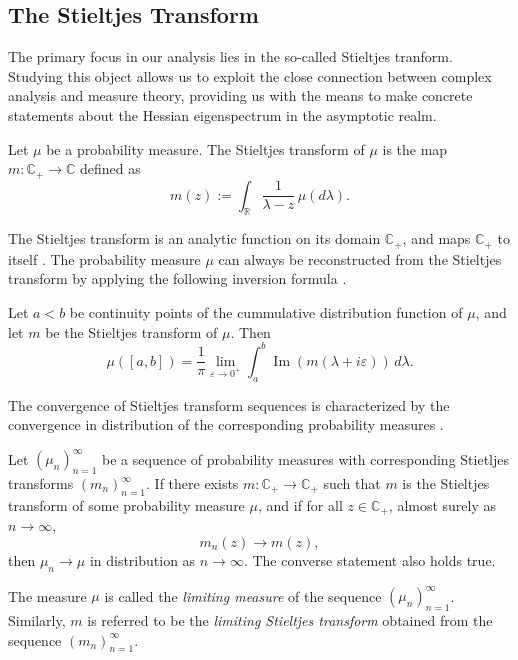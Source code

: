 \documentclass{article}
\begin{document}
\subsection{The Stieltjes Transform}
The primary focus in our analysis lies in the so-called Stieltjes tranform. Studying this object allows us to exploit the close connection between complex analysis and measure theory, providing us with the means to make concrete statements about the Hessian eigenspectrum in the asymptotic realm.
\bigskip
\begin{definition}
Let $\mu$ be a probability measure. The Stieltjes transform of $\mu$ is the map $m:\mathbb{C}_+\to\mathbb{C}$ defined as
$$m(z):=\int_{\mathbb{R}}\frac{1}{\lambda-z}\,\mu(d\lambda).$$
\end{definition}
\smallskip
\par
The Stieltjes transform is an analytic function on its domain $\mathbb{C}_+$, and maps $\mathbb{C}_+$ to itself \cite{hachem}. The probability measure $\mu$ can always be reconstructed from the Stieltjes transform by applying the following inversion formula \cite{couillet, hachem}.
\bigskip
\\
\begin{theorem}
Let $a<b$ be continuity points of the cummulative distribution function of $\mu$, and let $m$ be the Stieltjes transform of $\mu$. Then
$$\mu([a,b])=\frac{1}{\pi}\lim_{\varepsilon\to0^+}\int_a^b\operatorname{Im}(m(\lambda+i\varepsilon))\,d\lambda.$$\label{thm:inversion-formula}
\end{theorem}
\bigskip
\par
The convergence of Stieltjes transform sequences is characterized by the convergence in distribution of the corresponding probability measures \cite{couillet}.
\bigskip
\begin{theorem}\label{thm:limiting-measure}
Let $(\mu_n)_{n=1}^\infty$ be a sequence of probability measures with corresponding Stietljes transforms $(m_n)_{n=1}^\infty$. If there exists $m:\mathbb{C}_+\to\mathbb{C}_+$ such that $m$ is the Stieltjes transform of some probability measure $\mu$, and if for all $z\in\mathbb{C}_+$, almost surely as $n\to\infty$, 
$$m_n(z)\to m(z),$$
then $\mu_n\to\mu$ in distribution as $n\to\infty$. The converse statement also holds true.
\end{theorem}
\bigskip
\par
The measure $\mu$ is called the \emph{limiting measure} of the sequence $(\mu_n)_{n=1}^\infty$. Similarly, $m$ is referred to be the \emph{limiting Stieltjes transform} obtained from the sequence $(m_n)_{n=1}^\infty$.
\end{document}
